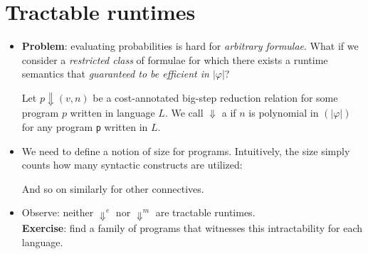 \documentclass{tufte-handout}
\begin{document}
\section{Tractable runtimes}
\begin{itemize}
  \item \textbf{Problem}: evaluating probabilities is hard for \emph{arbitrary
  formulae}. What if we consider a \emph{restricted class} of formulae for which
  there exists a runtime semantics that \emph{guaranteed to be efficient in
  $|\varphi|$}? 
  \begin{definition}
    Let $p \Downarrow (v, n)$ be a cost-annotated big-step reduction relation
    for some program $p$ written in language $L$. We call $\Downarrow$
    a  if $n$ is polynomial in $(|\varphi|)$ for any program \texttt{p} 
    written in $L$.
  \end{definition}

  \item We need to define a notion of size for \prop{} programs. Intuitively, the size 
  simply counts how many syntactic constructs are utilized:
  And so on similarly for other connectives.

  \item Observe: neither $\Downarrow^e$ nor $\Downarrow^m$ are tractable runtimes. \\
  \textbf{Exercise}: find a family of programs that witnesses this intractability for each 
  language.



\end{itemize}
\end{document}
